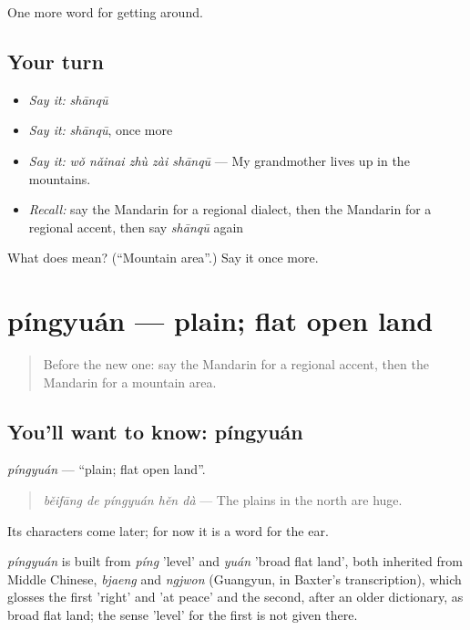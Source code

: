 \begin{grammarlens}[title={What you've built}]
One more word for getting around.
\end{grammarlens}

\subsection*{Your turn}
\begin{itemize}
\raggedright
  \item \emph{Say it:} \emph{shānqū}
  \item \emph{Say it:} \emph{shānqū}, once more
  \item \emph{Say it:} \emph{wǒ nǎinai zhù zài shānqū} — My grandmother lives up in the mountains.
  \item \emph{Recall:} say the Mandarin for a regional dialect, then the Mandarin for a regional accent, then say \emph{shānqū} again
\end{itemize}

\begin{tcolorbox}[breakable,colback=teal!4,colframe=teal!35!black,title={Before you move on}]
What does  mean? (\textquotedblleft{}Mountain area\textquotedblright{}.) Say it once more.
\end{tcolorbox}
\section[píngyuán]{píngyuán — plain; flat open land}

\label{lesson:ZH-C437-pingyuan}



\begin{quote}
Before the new one: say the Mandarin for a regional accent, then the Mandarin for a mountain area.
\end{quote}

\subsection*{You'll want to know: píngyuán}
\emph{píngyuán} — \textquotedblleft{}plain; flat open land\textquotedblright{}.

\begin{quote}
\emph{běifāng de píngyuán hěn dà} — The plains in the north are huge.
\end{quote}

Its characters come later; for now it is a word for the ear.

\begin{cousinweb}
\emph{píngyuán} is built from \emph{píng} 'level' and \emph{yuán} 'broad flat land', both inherited from Middle Chinese, \emph{bjaeng} and \emph{ngjwon} (Guangyun, in Baxter's transcription), which glosses the first 'right' and 'at peace' and the second, after an older dictionary, as broad flat land; the sense 'level' for the first is not given there.
\end{cousinweb}

